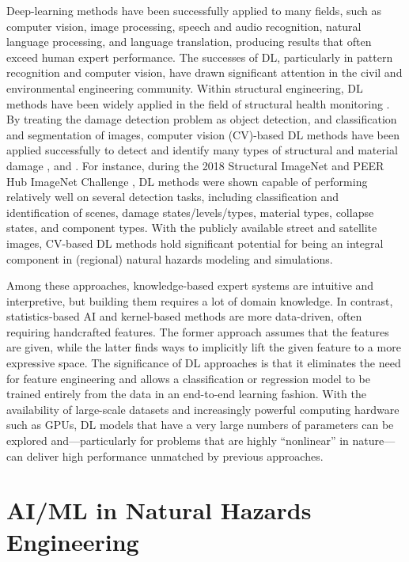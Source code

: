 Deep-learning methods have been successfully applied to many fields, such as computer vision, image processing, speech and audio recognition, natural language processing, and language translation, producing results that often exceed human expert performance. The successes of DL, particularly in pattern recognition and computer vision, have drawn significant attention in the civil and environmental engineering community. Within structural engineering, DL methods have been widely applied in the field of structural health monitoring \citep{salehia2018emerging}. By treating the damage detection problem as object detection, and classification and segmentation of images, computer vision (CV)-based DL methods have been applied successfully to detect and identify many types of structural and material damage \citep{cha2017deep,ferguson2018detection,gao2018deep,yeum2019automated}, and \citep{lenjani2020automated}. For instance, during the 2018 Structural ImageNet and PEER Hub ImageNet Challenge \citep{gao2018structural}, DL methods were shown capable of performing relatively well on several detection tasks, including classification and identification of scenes, damage states/levels/types, material types, collapse states, and component types. With the publicly available street and satellite images, CV-based DL methods hold significant potential for being an integral component in (regional) natural hazards modeling and simulations.

Among these approaches, knowledge-based expert systems are intuitive and interpretive, but building them requires a lot of domain knowledge. In contrast, statistics-based AI and kernel-based methods are more data-driven, often requiring handcrafted features. The former approach assumes that the features are given, while the latter finds ways to implicitly lift the given feature to a more expressive space. The significance of DL approaches is that it eliminates the need for feature engineering and allows a classification or regression model to be trained entirely from the data in an end-to-end learning fashion. With the availability of large-scale datasets and increasingly powerful computing hardware such as GPUs, DL models that have a very large numbers of parameters can be explored and---particularly for problems that are highly ``nonlinear'' in nature---can deliver high performance unmatched by previous approaches.

\section{AI/ML in Natural Hazards Engineering}
\label{sec:ai_nathaz}


